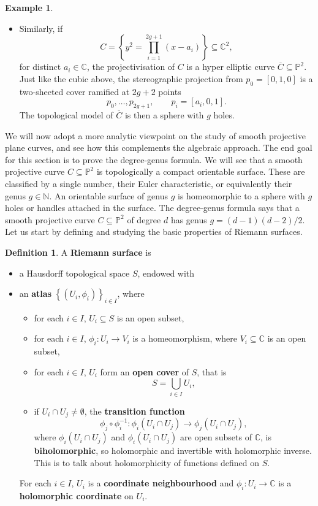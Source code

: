\documentclass{article}
\newcommand{\N}{\mathbb{N}}
\newcommand{\C}{\mathbb{C}}
\renewcommand{\P}{\mathbb{P}}
\newcommand{\rb}[1]{\left( #1 \right)}
\renewcommand{\sb}[1]{\left[ #1 \right]}
\newcommand{\cb}[1]{\left\{ #1 \right\}}
\theoremstyle{definition}\newtheorem{definition}{Definition}[section]
\theoremstyle{definition}\newtheorem{notation}[definition]{Notation}
\theoremstyle{definition}\newtheorem{remark}[definition]{Remark}
\theoremstyle{definition}\newtheorem{example1}[definition]{Example}
\theoremstyle{definition}\newtheorem{fact}{Fact}
\theoremstyle{definition}\newtheorem{exercise}{Exercise}
\theoremstyle{definition}\newtheorem*{example2}{Example}
\begin{document}
\begin{example2}
\begin{itemize}
\item Similarly, if
$$ C = \cb{y^2 = \prod_{i = 1}^{2g + 1} \rb{x - a_i}} \subseteq \C^2, $$
for distinct $ a_i \in \C $, the projectivisation of $ C $ is a hyper elliptic curve $ \overline{C} \subseteq \P^2 $. Just like the cubic above, the stereographic projection from $ p_0 = \sb{0, 1, 0} $ is a two-sheeted cover ramified at $ 2g + 2 $ points
$$ p_0, \dots, p_{2g + 1}, \qquad p_i = \sb{a_i, 0, 1}. $$
The topological model of $ \overline{C} $ is then a sphere with $ g $ holes.
\end{itemize}
\end{example2}

We will now adopt a more analytic viewpoint on the study of smooth projective plane curves, and see how this complements the algebraic approach. The end goal for this section is to prove the degree-genus formula. We will see that a smooth projective curve $ C \subseteq \P^2 $ is topologically a compact orientable surface. These are classified by a single number, their Euler characteristic, or equivalently their genus $ g \in \N $. An orientable surface of genus $ g $ is homeomorphic to a sphere with $ g $ holes or handles attached in the surface. The degree-genus formula says that a smooth projective curve $ C \subseteq \P^2 $ of degree $ d $ has genus $ g = \rb{d - 1}\rb{d - 2} / 2 $. Let us start by defining and studying the basic properties of Riemann surfaces.

\begin{definition}
\label{def:15.1}
A \textbf{Riemann surface} is
\begin{itemize}
\item a Hausdorff topological space $ S $, endowed with
\item an \textbf{atlas} $ \cb{\rb{U_i, \phi_i}}_{i \in I} $, where
\begin{itemize}
\item for each $ i \in I $, $ U_i \subseteq S $ is an open subset,
\item for each $ i \in I $, $ \phi_i : U_i \to V_i $ is a homeomorphism, where $ V_i \subseteq \C $ is an open subset,
\item for each $ i \in I $, $ U_i $ form an \textbf{open cover} of $ S $, that is
$$ S = \bigcup_{i \in I} U_i, $$
\item if $ U_i \cap U_j \ne \emptyset $, the \textbf{transition function}
$$ \phi_j \circ \phi_i^{-1} : \phi_i\rb{U_i \cap U_j} \to \phi_j\rb{U_i \cap U_j}, $$
where $ \phi_i\rb{U_i \cap U_j} $ and $ \phi_i\rb{U_i \cap U_j} $ are open subsets of $ \C $, is \textbf{biholomorphic}, so holomorphic and invertible with holomorphic inverse. This is to talk about holomorphicity of functions defined on $ S $.
\end{itemize}
For each $ i \in I $, $ U_i $ is a \textbf{coordinate neighbourhood} and $ \phi_i : U_i \to \C $ is a \textbf{holomorphic coordinate} on $ U_i $.
\end{itemize}
\end{definition}
\end{document}
